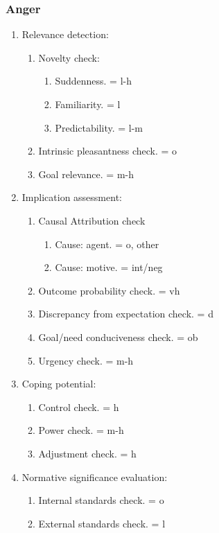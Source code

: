 {{\subsubsection{Anger}

\begin{enumerate}
\item  Relevance detection:
\begin{enumerate}
\item  Novelty check:
\begin{enumerate}
\item  Suddenness. = l-h
\item  Familiarity. = l
\item  Predictability. = l-m
\end{enumerate}
\item  Intrinsic pleasantness check. = o
\item  Goal relevance. = m-h
\end{enumerate}
\item  Implication assessment:
\begin{enumerate}
\item  Causal Attribution check
\begin{enumerate}
\item  Cause: agent. = o, other
\item  Cause: motive. = int/neg
\end{enumerate}
\item  Outcome probability check. = vh
\item  Discrepancy from expectation check. = d
\item  Goal/need conduciveness check. = ob
\item  Urgency check. = m-h
\end{enumerate}
\item  Coping potential:
\begin{enumerate}
\item  Control check. = h
\item  Power check. = m-h
\item  Adjustment check. = h
\end{enumerate}
\item  Normative significance evaluation:
\begin{enumerate}
\item  Internal standards check. = o
\item  External standards check. = l
\end{enumerate}
\end{enumerate}

}}

